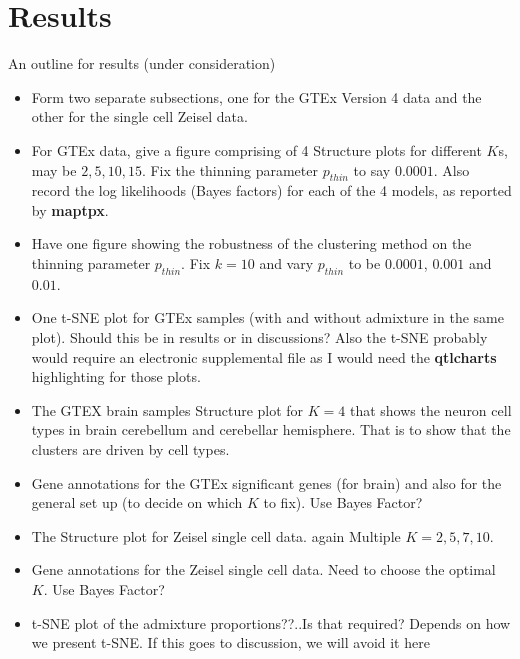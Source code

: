 \section{Results}

An outline for results  (under consideration)

\begin{itemize}

\item Form two separate subsections, one for the GTEx Version 4 data and the other for the single cell Zeisel data.

\item For GTEx data, give a figure comprising of 4 Structure plots for different $K$s, may be $2,5,10,15$. Fix the thinning parameter $p_{thin}$ to say $0.0001$.  Also record the log likelihoods (Bayes factors) for each of the 4 models, as reported by \textbf{maptpx}. 

\item Have one figure showing the robustness of the clustering method on the thinning parameter $p_{thin}$. Fix $k=10$ and vary $p_{thin}$ to be $0.0001$, $0.001$ and $0.01$. 

\item One t-SNE plot for GTEx samples (with and without admixture in the same plot). Should this be in results or in discussions? Also the t-SNE probably would require an electronic supplemental file as I would need the \textbf{qtlcharts} highlighting for those plots. 

\item The GTEX brain samples Structure plot  for $K=4$ that shows the neuron cell types in brain cerebellum and cerebellar hemisphere. That is to show that the clusters are driven by cell types.

\item Gene annotations for the GTEx significant genes (for brain) and also for the general set up (to decide on which $K$ to fix). Use Bayes Factor?

\item The Structure plot for Zeisel single cell data. again Multiple $K=2,5,7,10$. 

\item Gene annotations for the Zeisel single cell data. Need to choose the optimal $K$. Use Bayes Factor?

\item t-SNE plot of the admixture proportions??..Is that required? Depends on how we present t-SNE. If this goes to discussion, we will avoid it here

\end{itemize}



